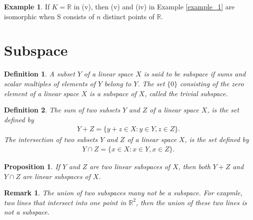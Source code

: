 \documentclass[11pt]{book}
\newtheorem{definition}{Definition}[chapter]
\newtheorem{proposition}{Proposition}[chapter]
\newtheorem{remark}{Remark}[chapter]
\theoremstyle{definition}
\newtheorem{example}{Example}[chapter]
\numberwithin{equation}{chapter}
\begin{document}
\medskip

\begin{example}
If $K=\mathbb{R}$ in (v), then (v) and (iv) in Example \ref{example_1} are isomorphic when S
consists of $n$ distinct points of $\mathbb{R}$.
\end{example}

\medskip

\section{Subspace}
\begin{definition}
A subset $Y$ of a linear space $X$ is said to be subspace if sums and scalar multiples of elements of $Y$ belong to $Y$. The set $\{0\}$ consisting of the zero element of a linear space $X$ is a subspace of $X$, called the trivial subspace.
\end{definition}

\medskip

\begin{definition}
The sum of two subsets $Y$ and $Z$ of a linear space $X$, is the set defined by 
\begin{align*}
    Y+Z = \{y+z\in X: y\in Y, z\in Z\}.
\end{align*}
The intersection of two subsets $Y$ and $Z$ of a linear space $X$, is the set defined by
\begin{align*}
    Y\cap Z = \{x\in X: x\in Y, x\in Z\}.
\end{align*}
\end{definition}

\medskip

\begin{proposition}
If $Y$ and $Z$ are two linear subspaces of $X$, then both $Y+Z$ and $Y\cap Z$ are linear subspaces of $X$.
\end{proposition}
\begin{remark}
The union of two subspaces many not be a subspace. For exapmle, two lines that intersect into one point in $\mathbb{R}^2$, then the union of these two lines is not a subspace.
\end{remark}

\medskip
\end{document}
